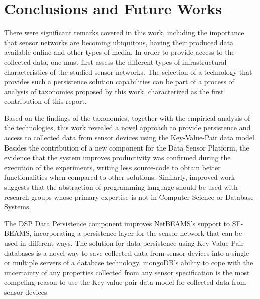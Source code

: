 

\chapter{Conclusions and Future Works}

There were significant remarks covered in this work, including the
importance that sensor networks are becoming ubiquitous, having their produced
data available online and other types of media. In order to provide access to
the collected data, one must first assess the different types of
infrastructural characteristics of the studied sensor networks. The selection
of a technology that provides such a persistence solution capabilities can be 
part of a process of analysis of taxonomies proposed by this work,
characterized as the first contribution of this report.

Based on the findings of the taxonomies, together with the empirical analysis
of the technologies, this work revealed a novel approach to provide
persistence and access to collected data from sensor devices using the
Key-Value-Pair data model. Besides the contribution of a new component for the
Data Sensor Platform, the evidence that the system improves productivity was
confirmed during the execution of the experiments, writing less source-code to
obtain better functionalities when compared to other solutions. Similarly,
improved work suggests that the abstraction of programming language should be
used with research groups whose primary expertise is not in Computer Science
or Database Systems.

The DSP Data Persistence component improves NetBEAMS's support to SF-BEAMS,
incorporating a persistence layer for the sensor network that can be used in
different ways. The solution for data persistence using Key-Value Pair
databases is a novel way to save collected data from sensor devices into a
single or multiple servers of a database technology. mongoDB's ability to cope
with the uncertainty of any properties collected from any sensor specification
is the most compeling reason to use the Key-value pair data model for collected
data from sensor devices.

